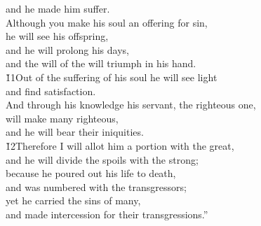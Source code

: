 \begin{poetry}
\poemll    and he made him suffer. \\
\poeml Although you make his soul an offering for sin, \\
\poemll    he will see his offspring, \\
\poeml and he will prolong his days, \\
\poemll    and the will of the  will triumph in his hand. \\
\poeml \v{11}Out of the suffering of his soul he will see light \\
\poemll    and find satisfaction. \\
\poeml And through his knowledge his servant, the righteous one, \\
\poemll    will make many righteous, \\
\poemlll       and he will bear their iniquities. \\
\poeml \v{12}Therefore I will allot him a portion with the great, \\
\poemll    and he will divide the spoils with the strong; \\
\poeml because he poured out his life to death, \\
\poemll    and was numbered with the transgressors; \\
\poeml yet he carried the sins of many, \\
\poemll    and made intercession for their transgressions.''
\end{poetry}

